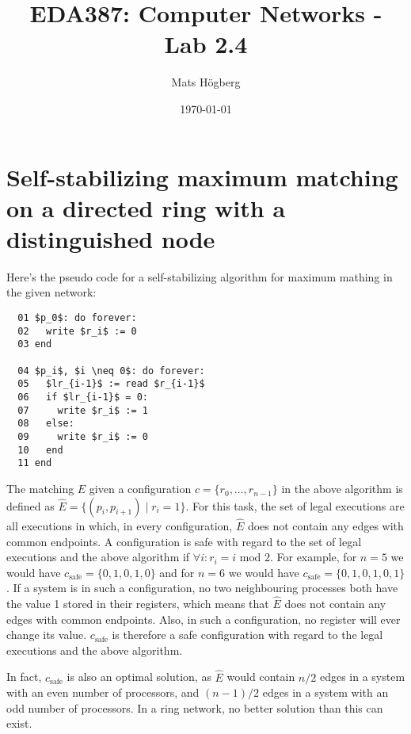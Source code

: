 \documentclass{article}
\title{EDA387: Computer Networks - Lab 2.4}
\author{Mats Högberg}
\date{\today}
\begin{document}
\maketitle

\section*{Self-stabilizing maximum matching on a directed ring with a distinguished node}

Here's the pseudo code for a self-stabilizing algorithm for maximum mathing in the given network:

\begin{lstlisting}
  01 $p_0$: do forever:
  02   write $r_i$ := 0
  03 end

  04 $p_i$, $i \neq 0$: do forever:
  05   $lr_{i-1}$ := read $r_{i-1}$
  06   if $lr_{i-1}$ = 0:
  07     write $r_i$ := 1
  08   else:
  09     write $r_i$ := 0
  10   end
  11 end
\end{lstlisting}

The matching $\hat{E}$ given a configuration $c = \{r_0, \ldots, r_{n-1}\}$ in the above algorithm is defined as $\hat{E} = \{(p_i, p_{i+1}) \; | \; r_i = 1\}$. For this task, the set of legal executions are all executions in which, in every configuration, $\hat{E}$ does not contain any edges with common endpoints. A configuration is safe with regard to the set of legal executions and the above algorithm if $\forall i : r_i = i \text{ mod } 2$. For example, for $n = 5$ we would have $c_{\text{safe}} = \{0, 1, 0, 1, 0\}$ and for $n = 6$ we would have $c_{\text{safe}} = \{0, 1, 0, 1, 0, 1\}$. If a system is in such a configuration, no two neighbouring processes both have the value 1 stored in their registers, which means that $\hat{E}$ does not contain any edges with common endpoints. Also, in such a configuration, no register will ever change its value. $c_{\text{safe}}$ is therefore a safe configuration with regard to the legal executions and the above algorithm.

In fact, $c_{\text{safe}}$ is also an optimal solution, as $\hat{E}$ would contain $n / 2$ edges in a system with an even number of processors, and $(n-1) / 2$ edges in a system with an odd number of processors. In a ring network, no better solution than this can exist.
\end{document}
